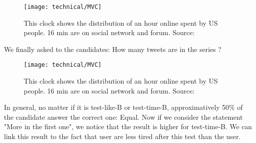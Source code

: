 \begin{figure}[h] 
\centering 
\texttt{[image: technical/MVC]} 
\caption[Time spent of Social Media]{This clock shows the distribution of an hour online spent by US people. 16 min are on social network and forum. Source: \cite{s_clock}}
\label{fig:tinder} 
\end{figure}

We finally asked to the candidates: How many tweets are in the series ?\\ 

\begin{figure}[h] 
\centering 
\texttt{[image: technical/MVC]} 
\caption[Time spent of Social Media]{This clock shows the distribution of an hour online spent by US people. 16 min are on social network and forum. Source: \cite{s_clock}}
\label{fig:tinder} 
\end{figure}

In general, no matter if it is test-like-B or test-time-B, approximatively 50\% of the candidate answer the correct one: Equal. Now if we consider the statement "More in the first one", we notice that the result is higher for test-time-B. We can link this result to the fact that user are less tired after this test than the user.




